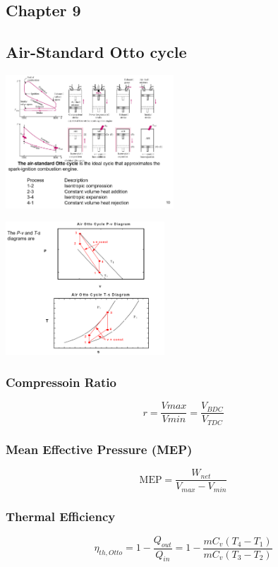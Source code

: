 \documentclass[10pt,landscape]{article}
\newenvironment{Figure}
     {\par\medskip\noindent\minipage{\linewidth}}
     {\endminipage\par\medskip}
\begin{document}
\begin{multicols}{3}
\section{Chapter 9}
\subsection{Air-Standard Otto cycle}
\begin{Figure}
    \centering
    \includegraphics[width=\linewidth, height=5cm]{Air-Standard_OttoCycle.png}
\end{Figure}
\begin{Figure}
    \centering
    \includegraphics[width=\linewidth, height=5cm]{Air-Standard_OttoCycle_PVTS.png}
\end{Figure}
\subsubsection{Compressoin Ratio}
\begin{equation}
    r=\frac{Vmax}{Vmin}=\frac{V_{BDC}}{V_{TDC}}
\end{equation}
\subsubsection{Mean Effective Pressure (MEP)}
\begin{equation}
    \text{MEP}=\frac{W_{net}}{V_{max}-V_{min}}
\end{equation}
\subsubsection{Thermal Efficiency}
\begin{equation}
    \eta_{th,Otto}=1-\frac{Q_{out}}{Q_{in}}=1-\frac{mC_v(T_4-T_1)}{mC_v(T_3-T_2)}
\end{equation}

\end{multicols}
\end{document}
